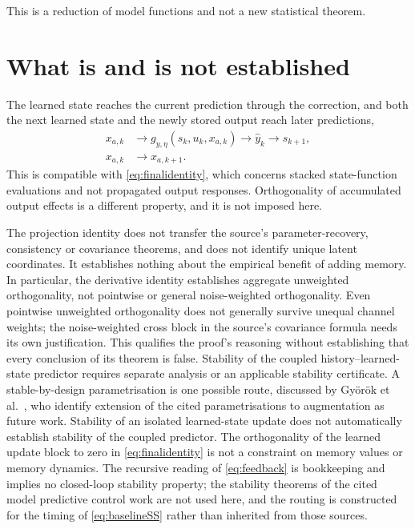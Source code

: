 \documentclass[11pt,a4paper]{article}
\theoremstyle{remark}
\begin{document}
This is a reduction of model functions and not a new statistical theorem.

\section{What is and is not established}\label{sec:limits}
The learned state reaches the current prediction through the correction, and both the next learned
state and the newly stored output reach later predictions,
\begin{equation*}
\begin{aligned}
x_{a,k}&\longrightarrow g_{y,\eta}(s_k,u_k,x_{a,k})\longrightarrow\hat y_k\longrightarrow s_{k+1},\\
x_{a,k}&\longrightarrow x_{a,k+1}.
\end{aligned}
\end{equation*}
This is compatible with \eqref{eq:finalidentity}, which concerns stacked state-function
evaluations and not propagated output responses. Orthogonality of accumulated output effects is a
different property, and it is not imposed here.

The projection identity does not transfer the source's parameter-recovery, consistency or
covariance theorems, and does not identify unique latent coordinates. It establishes nothing about
the empirical benefit of adding memory. In particular, the derivative identity establishes
aggregate unweighted orthogonality, not pointwise or general noise-weighted orthogonality.
Even pointwise unweighted orthogonality does not generally survive unequal channel weights;
the noise-weighted cross block in the source's covariance formula needs its own justification.
This qualifies the proof's reasoning without establishing that every conclusion of its theorem
is false. Stability of
the coupled history--learned-state predictor requires separate
analysis or an applicable stability certificate. A stable-by-design parametrisation is one
possible route, discussed by Gy\"or\"ok et al.~\cite[Remark~13]{gyorok2026obc}, who identify extension of
the cited parametrisations to augmentation as future work. Stability of an isolated learned-state
update does not automatically establish stability of the coupled predictor. The orthogonality of
the learned update block to zero in
\eqref{eq:finalidentity} is not a constraint on memory values or memory dynamics. The recursive
reading of \eqref{eq:feedback} is bookkeeping and implies no closed-loop stability property; the
stability theorems of the cited model predictive control work are not used here, and the routing
is constructed for the timing of \eqref{eq:baselineSS} rather than inherited from those sources.
\end{document}
